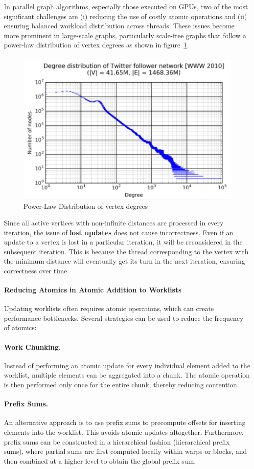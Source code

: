 \documentclass[12pt]{book}
\begin{document}
In parallel graph algorithms, especially those executed on GPUs, two of the most significant challenges are (i) reducing the use of costly atomic operations and (ii) ensuring balanced workload distribution across threads. These issues become more prominent in large-scale graphs, particularly scale-free graphs that follow a power-law distribution of vertex degrees as shown in figure~\ref{fig:powerlaw}.
\begin{figure}
    \centering
    \includegraphics[width=0.5\linewidth]{images/powerlaw.png}
    \caption{Power-Law Distribution of vertex degrees}
    \label{fig:powerlaw}
\end{figure}
Since all active vertices with non-infinite distances are processed in every iteration, the issue of \textbf{lost updates} does not cause incorrectness. Even if an update to a vertex is lost in a particular iteration, it will be reconsidered in the subsequent iteration. This is because the thread corresponding to the vertex with the minimum distance will eventually get its turn in the next iteration, ensuring correctness over time.

\paragraph{Reducing Atomics in Atomic Addition to Worklists}
Updating worklists often requires atomic operations, which can create performance bottlenecks. Several strategies can be used to reduce the frequency of atomics:

\paragraph{Work Chunking.}  
Instead of performing an atomic update for every individual element added to the worklist, multiple elements can be aggregated into a chunk. The atomic operation is then performed only once for the entire chunk, thereby reducing contention.  

\paragraph{Prefix Sums.}  
An alternative approach is to use prefix sums to precompute offsets for inserting elements into the worklist. This avoids atomic updates altogether. Furthermore, prefix sums can be constructed in a hierarchical fashion (hierarchical prefix sums), where partial sums are first computed locally within warps or blocks, and then combined at a higher level to obtain the global prefix sum.
\end{document}

